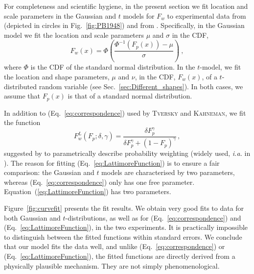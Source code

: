 \documentclass[a4paper, 12pt]{article}
\newcommand{\person}[1]{\textsc{#1}\xspace}
\newcommand{\elabel}[1]{\label{eq:#1}}
\newcommand{\eref}[1]{(Eq.~\ref{eq:#1})}
\newcommand{\Eref}[1]{Equation~(\ref{eq:#1})}
\newcommand{\fref}[1]{Fig.~\ref{fig:#1}}
\newcommand{\Fref}[1]{Figure~\ref{fig:#1}}
\newcommand{\secref}[1]{Sec.~\ref{sec:#1}}
\newcommand{\ia}{\textit{i.a.}\xspace}
\newcommand{\be}{\begin{equation}}
\newcommand{\ee}{\end{equation}}
\begin{document}
For completeness and scientific hygiene, in the present section we fit location and scale parameters in the Gaussian and $t$ models for $F_w$ to experimental data from \textcite{PrestonBaratta1948} (depicted in circles in \fref{PB1948}) and from \textcite{TverskyFox1995}. Specifically, in the Gaussian model we fit the location and scale parameters $\mu$ and $\sigma$ in the CDF,
%
\be
F_w\left(x\right) = \Phi\left(\frac{\Phi^{-1}\left(F_p\left(x\right)\right) - \mu}{\sigma}\right)~,
\ee
%
where $\Phi$ is the CDF of the standard normal distribution. In the $t$-model, we fit the location and shape parameters, $\mu$ and $\nu$, in the CDF, $F_w(x)$, of a $t$-distributed random variable (see \secref{Different_shapes}). In both cases, we assume that $F_p(x)$ is that of a standard normal distribution.

In addition to \eref{correspondence} used by \person{Tversky} and \person{Kahneman}, we fit the function
%
\be
F^{L}_w\left(F_p; \delta,\gamma\right) =\frac{\delta F_p^{\gamma}}{\delta F_p^{\gamma} + \left(1-F_p\right)^{\gamma}}\,,
\elabel{LattimoreFunction}
\ee
%
suggested by \textcite{LattimoreBakerWitte1992} to parametrically describe probability weighting (widely used, \ia in \textcite{TverskyWakker1995,Prelec1998}). The reason for fitting \eref{LattimoreFunction} is to ensure a fair comparison: the Gaussian and $t$ models are characterised by two parameters, whereas \eref{correspondence} only has one free parameter. \Eref{LattimoreFunction} has two parameters.

\Fref{curvefit} presents the fit results. We obtain very good fits to data for both Gaussian and $t$-distributions, as well as for \eref{correspondence} and \eref{LattimoreFunction}, in the two experiments. It is practically impossible to distinguish between the fitted functions within standard errors. We conclude that our model fits the data well, and unlike \eref{correspondence} or \eref{LattimoreFunction}, the fitted functions are directly derived from a physically plausible mechanism. They are not simply phenomenological.
\end{document}
